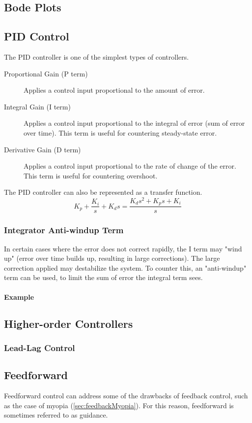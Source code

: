 \documentclass[../notes.tex]{subfiles}
\begin{document}
\subsection{Bode Plots}

\subsection{PID Control}
The PID controller is one of the simplest types of controllers.
\begin{description}
    \item[Proportional Gain (P term)] Applies a control input proportional to the amount of error.
    \item[Integral Gain (I term)] Applies a control input proportional to the integral of error (sum of error over time). This term is useful for countering steady-state error.
    \item[Derivative Gain (D term)] Applies a control input proportional to the rate of change of the error. This term is useful for countering overshoot.
\end{description}
The PID controller can also be represented as a transfer function.
\begin{equation} \label{eq:PIDTF}
    K_p + \frac{K_i}{s} + K_d s = \frac{K_ds^2 + K_ps + K_i}{s}
\end{equation}
\subsubsection{Integrator Anti-windup Term}
In certain cases where the error does not correct rapidly, the I term may "wind up" (error over time builds up, resulting in large corrections). The large correction applied may destabilize the system. To counter this, an "anti-windup" term can be used, to limit the sum of error the integral term sees.
\paragraph{Example}
\subsection{Higher-order Controllers}
\subsubsection{Lead-Lag Control}
\subsection{Feedforward}
Feedforward control can address some of the drawbacks of feedback control, such as the case of myopia (\underline{\ref{sec:feedbackMyopia}}). For this reason, feedforward is sometimes referred to as guidance.
\end{document}
